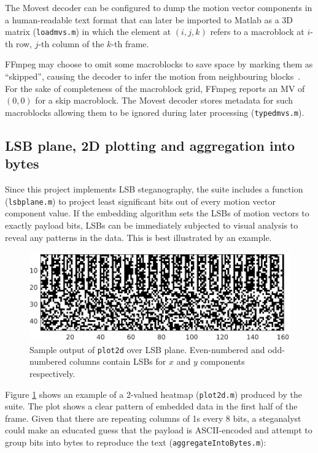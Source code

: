 \documentclass[12pt,british,twoside,notitlepage,usenames,dvipsnames,hypens,final]{report}
\numberwithin{equation}{section}
\numberwithin{figure}{section}
\begin{document}
The Movest decoder can be configured to dump the motion vector components in a human-readable text format that can later be imported to Matlab as a 3D matrix (\texttt{loadmvs.m}) in which the element at $(i, j, k)$ refers to a macroblock at $i$-th row, $j$-th column of the $k$-th frame. 

FFmpeg may choose to omit some macroblocks to save space by marking them as ``skipped'', causing the decoder to infer the motion from neighbouring blocks~\cite{tourapis2004direct}. For the sake of completeness of the macroblock grid, FFmpeg reports an MV of $(0, 0)$ for a skip macroblock. The Movest decoder stores metadata for such macroblocks allowing them to be ignored during later processing (\texttt{typedmvs.m}).

\subsection{LSB plane, 2D plotting and aggregation into bytes}

Since this project implements LSB steganography, the suite includes a function (\texttt{lsbplane.m}) to project least significant bits out of every motion vector component value. If the embedding algorithm sets the LSBs of motion vectors to exactly payload bits, LSBs can be immediately subjected to visual analysis to reveal any patterns in the data. This is best illustrated by an example.

\begin{figure}[tbh]
\centerline{\includegraphics{img/unencrypted-enc.eps}}
\caption{Sample output of \texttt{plot2d} over LSB plane. Even-numbered and odd-numbered columns contain LSBs for $x$ and $y$ components respectively.}
\label{fig:unencrypted-enc}
\end{figure}

Figure \ref{fig:unencrypted-enc} shows an example of a 2-valued heatmap (\texttt{plot2d.m}) produced by the suite. The plot shows a clear pattern of embedded data in the first half of the frame. Given that there are repeating columns of 1s every 8 bits, a steganalyst could make an educated guess that the payload is ASCII-encoded and attempt to group bits into bytes to reproduce the text (\texttt{aggregateIntoBytes.m}):
\end{document}

